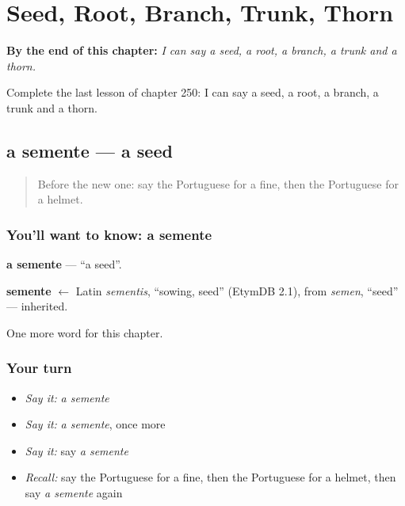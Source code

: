 
\chapter{Seed, Root, Branch, Trunk, Thorn}
\label{ch:pt-seed-root-branch-trunk-thorn}

\begin{chapteropening}
\textbf{By the end of this chapter:} \emph{I can say a seed, a root, a branch, a trunk and a thorn.}

Complete the last lesson of chapter 250: I can say a seed, a root, a branch, a trunk and a thorn.
\end{chapteropening}

\section[a semente]{a semente — a seed}

\label{lesson:PT-C250-semente}



\begin{quote}
Before the new one: say the Portuguese for a fine, then the Portuguese for a helmet.
\end{quote}

\subsection*{You'll want to know: a semente}
\textbf{a semente} — \textquotedblleft{}a seed\textquotedblright{}.

\begin{cousinweb}
\textbf{semente} $\leftarrow$ Latin \emph{sementis}, \textquotedblleft{}sowing, seed\textquotedblright{} (EtymDB 2.1), from \emph{semen}, \textquotedblleft{}seed\textquotedblright{} — inherited.
\end{cousinweb}

\begin{grammarlens}[title={What you've built}]
One more word for this chapter.
\end{grammarlens}

\subsection*{Your turn}
\begin{itemize}
\raggedright
  \item \emph{Say it:} \emph{a semente}
  \item \emph{Say it:} \emph{a semente}, once more
  \item \emph{Say it:} say \emph{a semente}
  \item \emph{Recall:} say the Portuguese for a fine, then the Portuguese for a helmet, then say \emph{a semente} again
\end{itemize}

